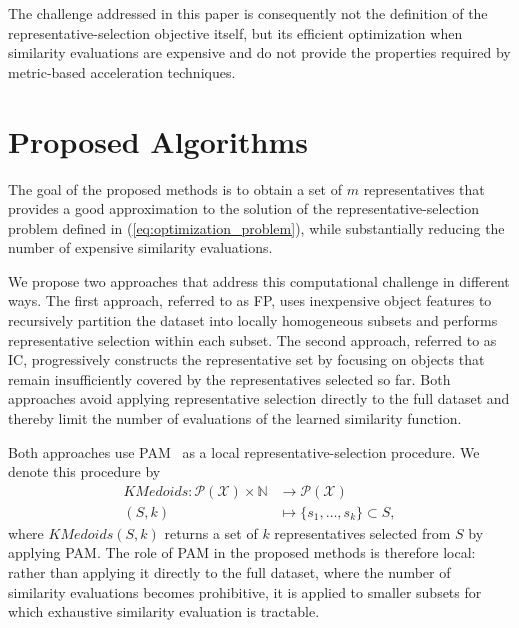 \documentclass{ieeeaccess}
\newcommand{\representativeamount}{m}
\newcommand{\kmedoidsalg}{KMedoids\xspace}
\newcommand{\partitioning}{FP\xspace}
\newcommand{\inclusion}{IC\xspace}
\begin{document}
The challenge addressed in this paper is consequently not the definition of the representative-selection objective itself, but its efficient optimization when similarity evaluations are expensive and do not provide the properties required by metric-based acceleration techniques. 

\section{Proposed Algorithms}
\label{sec:algorithms}

The goal of the proposed methods is to obtain a set of $\representativeamount$ representatives that provides a good approximation to the solution of the representative-selection problem defined in (\ref{eq:optimization_problem}), while substantially reducing the number of expensive similarity evaluations.

We propose two approaches that address this computational challenge in different ways. The first approach, referred to as \partitioning, uses inexpensive object features to recursively partition the dataset into locally homogeneous subsets and performs representative selection within each subset. The second approach, referred to as \inclusion, progressively constructs the representative set by focusing on objects that remain insufficiently covered by the representatives selected so far. Both approaches avoid applying representative selection directly to the full dataset and thereby limit the number of evaluations of the learned similarity function.

Both approaches use PAM~\cite{kaufman1987clustering} as a local representative-selection procedure. We denote this procedure by
\[
\begin{aligned}
\kmedoidsalg:\mathcal{P}(\mathcal{X})\times\mathbb{N}
&\to \mathcal{P}(\mathcal{X})\\
(S,k) &\mapsto \{s_1,\ldots,s_k\}\subset S,
\end{aligned}
\]
where $\kmedoidsalg(S,k)$ returns a set of $k$ representatives selected from $S$ by applying PAM. The role of PAM in the proposed methods is therefore local: rather than applying it directly to the full dataset, where the number of similarity evaluations becomes prohibitive, it is applied to smaller subsets for which exhaustive similarity evaluation is tractable.
\end{document}

